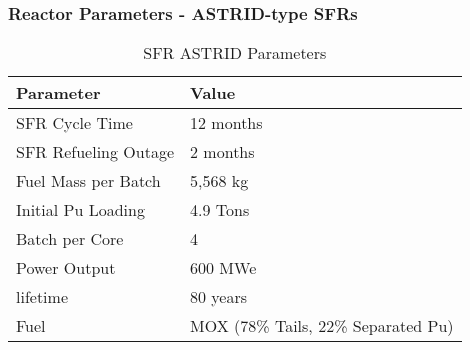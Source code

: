 \begin{frame}
    \frametitle{Reactor Parameters - ASTRID-type SFRs}
    
\begin{table}[h]
    \centering
    \begin{tabularx}{\textwidth}{bb}
        \hline
        Parameter & Value \\
        \hline
        SFR Cycle Time & 12 months \\ 
        SFR Refueling Outage & 2 months \\
        Fuel Mass per Batch & 5,568 kg \\
        Initial Pu Loading & 4.9 Tons \\
        Batch per Core & 4 \\
        Power Output & 600 MWe \\
        lifetime & 80 years \\
        Fuel & {\small \gls{MOX} (78\% Tails, 22\% Separated Pu)}\\
        \hline
    \end{tabularx}
    \caption {\gls{SFR} ASTRID Parameters \cite{varaine_pre-conceptual_2012}}
    \label{tab:sfr}
\end{table}
\end{frame}
